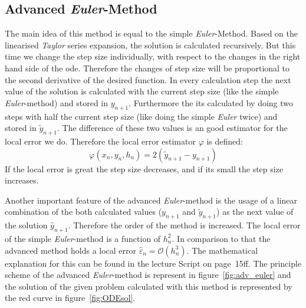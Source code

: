 \documentclass[11pt,a4paper,oneside]{scrartcl}
\begin{document}
\subsection{Advanced \textit{Euler}-Method}
The main idea of this method is equal to the simple \textit{Euler}-Method. Based on the linearised \textit{Taylor} series expansion, the solution is calculated recursively. But this time we change the step size individually, with respect to the changes in the right hand side of the ode. Therefore the changes of step size will be proportional to the second derivative of the desired function. In every calculation step the next value of the solution is calculated with the current step size (like the simple \textit{Euler}-method) and stored in $y_{n+1}$. Furthermore the its calculated by doing two steps with half the current step size (like doing the simple \textit{Euler} twice) and stored in $\tilde{y}_{n+1}$. The difference of these two values is an good estimator for the local error we do. Therefore the local error estimator $\varphi$ is defined:
\begin{equation}
\varphi(x_n,y_n,h_n) = 2(\tilde{y}_{n+1}-y_{n+1})
\end{equation}
If the local error is great the step size decreases, and if its small the step size increases.

Another important feature of the advanced \textit{Euler}-method is the usage of a linear combination of the both calculated values ($y_{n+1}$ and $\tilde{y}_{n+1}$) as the next value of the solution $\hat{y}_{n+1}$. Therefore the order of the method is increased. The local error of the simple \textit{Euler}-method is a function of $h_n^2$. In comparison to that the advanced method holds a local error $\hat{\varepsilon}_n = \mathcal O (h_n^3)$.
 The mathematical explanation for this can be found in the lecture Script on page~15ff.
The principle scheme of the advanced \textit{Euler}-method is represent in figure~\ref{fig:adv_euler} and the solution of the given problem calculated with this method is represented by the red curve in figure~\ref{fig:ODEsol}.
\end{document}
